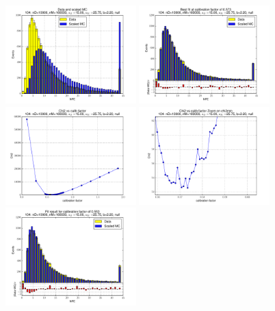 
 \begin{figure}[htbp] \begin{center} 
\includegraphics[width=0.45\textwidth]{../FIGURES/104/FIG_Data_and_scaled_MC.pdf} 
\includegraphics[width=0.45\textwidth]{../FIGURES/104/FIG_Best_fit_at_calibration_factor_of_0_573.pdf} 
\includegraphics[width=0.45\textwidth]{../FIGURES/104/FIG_Chi2_vs_calib_factor.pdf} 
\includegraphics[width=0.45\textwidth]{../FIGURES/104/FIG_Chi2_vs_calib_factor_Zoom_on_chi2min.pdf} 
\includegraphics[width=0.45\textwidth]{../FIGURES/104/FIG_Fit_result_for_calibration_factor_of_0_553.pdf} 

\end{center}
\end{figure}
